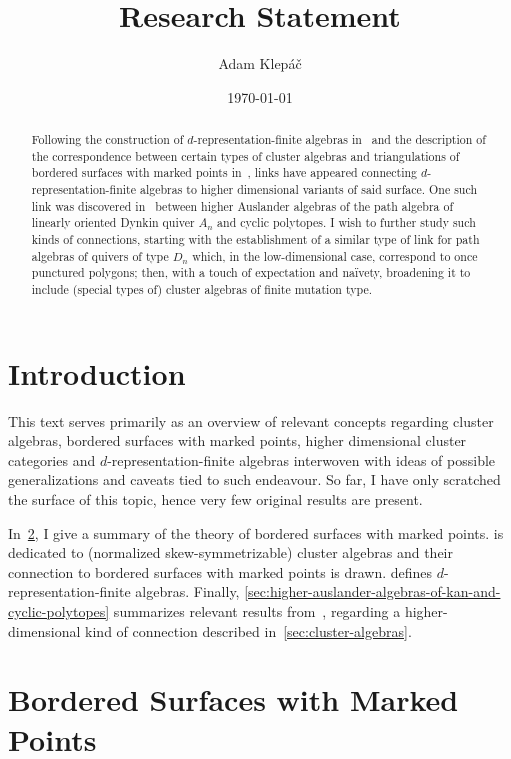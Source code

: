 \documentclass[a4paper,oneside,svgnames,draft]{amsart}
\title{Research Statement}
\author{Adam Klepáč}
\date{\today}
\theoremstyle{plain}
\theoremstyle{definition}
\begin{document}
 \maketitle
 \begin{abstract}
  Following the construction of $d$-representation-finite algebras
  in~\cite{iyama} and the description of the correspondence between certain
  types of cluster algebras and triangulations of bordered surfaces with marked
  points in~\cite{fst}, links have appeared connecting $d$-representation-finite
  algebras to higher dimensional variants of said surface. One such link was
  discovered in~\cite{ot} between higher Auslander algebras of the path algebra
  of linearly oriented Dynkin quiver $A_n$ and cyclic polytopes. I wish to
  further study such kinds of connections, starting with the establishment of a
  similar type of link for path algebras of quivers of type $D_n$ which, in the
  low-dimensional case, correspond to once punctured polygons; then, with a
  touch of expectation and naïvety, broadening it to include (special types of)
  cluster algebras of finite mutation type.
 \end{abstract}

 \section{Introduction}
 \label{sec:introduction}

 This text serves primarily as an overview of relevant concepts regarding
 cluster algebras, bordered surfaces with marked points, higher dimensional
 cluster categories and $d$-representation-finite algebras interwoven with ideas
 of possible generalizations and caveats tied to such endeavour. So far, I have
 only scratched the surface of this topic, hence very few original results are
 present.

 In~\cref{sec:bordered-surfaces-with-marked-points}, I give a summary of the
 theory of bordered surfaces with marked points.  is
 dedicated to (normalized skew-symmetrizable) cluster algebras and their
 connection to bordered surfaces with marked points is drawn.
  defines $d$-representation-finite algebras.
 Finally, \cref{sec:higher-auslander-algebras-of-kan-and-cyclic-polytopes}
 summarizes relevant results from~\cite{ot}, regarding a higher-dimensional kind
 of connection described in~\cref{sec:cluster-algebras}.

 \section{Bordered Surfaces with Marked Points}
 \label{sec:bordered-surfaces-with-marked-points}
\end{document}
